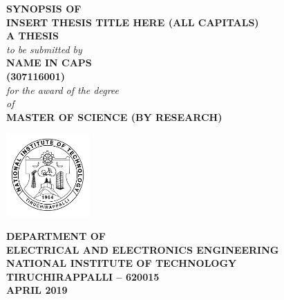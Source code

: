 \begin{titlepage}
\begin{center}
\thispagestyle{empty}
\large
\textbf{SYNOPSIS OF}\\
\bigskip
\large{\textbf{INSERT THESIS TITLE HERE (ALL CAPITALS)}}
\\
\bigskip \bigskip \bigskip \bigskip  
\large
\textbf {A THESIS}\\
\emph{to be submitted by}\\
\bigskip \bigskip \bigskip \bigskip
\textbf{NAME IN CAPS}\\
\textbf{(307116001)} %
\\
\bigskip \bigskip \bigskip \bigskip
\emph{for the award of the degree}\\ \bigskip \bigskip
\emph{of}\\
\bigskip \bigskip
\textbf{MASTER OF SCIENCE (BY RESEARCH)}\\

\bigskip \bigskip \bigskip \bigskip \bigskip  
\centering

\includegraphics[width=1.25in, height=1.25in]{NITT} %

\bigskip \bigskip
\normalsize
\large\textbf{DEPARTMENT OF}\\
\large\textbf{ELECTRICAL AND ELECTRONICS ENGINEERING}\\ %
\large\textbf{NATIONAL INSTITUTE OF TECHNOLOGY}\\
\large\textbf{TIRUCHIRAPPALLI -- 620015}\\
\vspace{0.20in}
\large\textbf{APRIL 2019} %
\end{center}
\end{titlepage} 